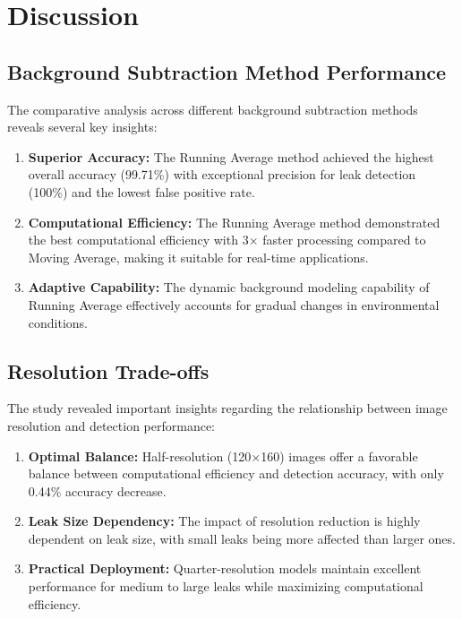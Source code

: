 \section{Discussion}

\subsection{Background Subtraction Method Performance}

The comparative analysis across different background subtraction methods reveals several key insights:

\begin{enumerate}
\item \textbf{Superior Accuracy:} The Running Average method achieved the highest overall accuracy (99.71\%) with exceptional precision for leak detection (100\%) and the lowest false positive rate.

\item \textbf{Computational Efficiency:} The Running Average method demonstrated the best computational efficiency with 3× faster processing compared to Moving Average, making it suitable for real-time applications.

\item \textbf{Adaptive Capability:} The dynamic background modeling capability of Running Average effectively accounts for gradual changes in environmental conditions.
\end{enumerate}

\subsection{Resolution Trade-offs}

The study revealed important insights regarding the relationship between image resolution and detection performance:

\begin{enumerate}
\item \textbf{Optimal Balance:} Half-resolution (120×160) images offer a favorable balance between computational efficiency and detection accuracy, with only 0.44\% accuracy decrease.

\item \textbf{Leak Size Dependency:} The impact of resolution reduction is highly dependent on leak size, with small leaks being more affected than larger ones.

\item \textbf{Practical Deployment:} Quarter-resolution models maintain excellent performance for medium to large leaks while maximizing computational efficiency.
\end{enumerate}


